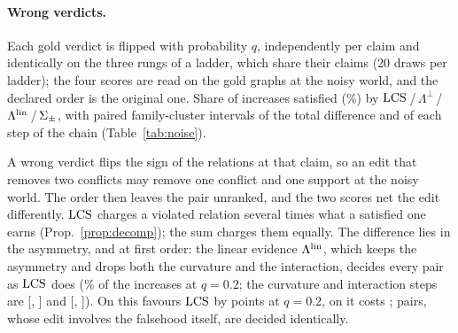 \paragraph{Wrong verdicts.} Each gold verdict is flipped with probability $q$, independently per
claim and identically on the three rungs of a ladder, which share their claims (20 draws per
ladder); the four scores are read on the gold graphs at the noisy world, and the declared
order is the original one. Share of increases satisfied (\%) by $\mathrm{LCS}$\,/\,$\Lambda^{\perp}$\,/\,$\Lambda^{\mathrm{lin}}$\,/\,$\Sigma_{\pm}$, with
paired family-cluster intervals of the total difference and of each step of the chain
(Table~\ref{tab:noise}).

A wrong verdict flips the sign of the relations at that claim, so an edit that removes two conflicts
may remove one conflict and one support at the noisy world. The order then leaves the pair
unranked, and the two scores net the edit differently. $\mathrm{LCS}$ charges a violated relation several
times what a satisfied one earns (Prop.~\ref{prop:decomp}); the sum charges them equally. The difference lies in the asymmetry, and at first order: the linear evidence $\Lambda^{\mathrm{lin}}$, which keeps
the asymmetry and drops both the curvature and the interaction, decides every pair as $\mathrm{LCS}$ does
(\vnLinIncTwenty\% of the increases at $q=0.2$; the curvature and interaction steps are
[\vnDiffILLoIncTwenty, \vnDiffILHiIncTwenty] and [\vnDiffLILoIncTwenty, \vnDiffLIHiIncTwenty]). On  this
favours $\mathrm{LCS}$ by \asapCI{\vnDiffLoConflictTwenty}{\vnDiffHiConflictTwenty} points at $q=0.2$, on
 it costs \asapCI{\vnDiffLoChainTwenty}{\vnDiffHiChainTwenty};  pairs, whose edit
involves the falsehood itself, are decided identically.

